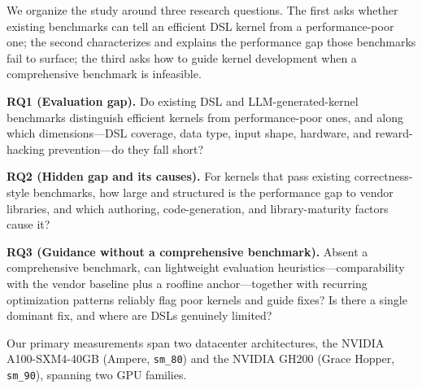 
We organize the study around three research questions.
The first asks whether existing benchmarks can tell an efficient DSL kernel from a
performance-poor one; the second characterizes and explains the performance gap those
benchmarks fail to surface; the third asks how to guide kernel development when a
comprehensive benchmark is infeasible.

\noindent\textbf{RQ1 (Evaluation gap).} Do existing DSL and LLM-generated-kernel
benchmarks distinguish efficient kernels from performance-poor ones, and along which
dimensions---DSL coverage, data type, input shape, hardware, and reward-hacking
prevention---do they fall short?

\medskip\noindent\textbf{RQ2 (Hidden gap and its causes).} For kernels that pass
existing correctness-style benchmarks, how large and structured is the performance gap
to vendor libraries, and which authoring, code-generation, and library-maturity factors
cause it?

\medskip\noindent\textbf{RQ3 (Guidance without a comprehensive benchmark).} Absent a
comprehensive benchmark, can lightweight evaluation heuristics---comparability with the
vendor baseline plus a roofline anchor---together with recurring optimization patterns
reliably flag poor kernels and guide fixes? Is there a single dominant fix, and where
are DSLs genuinely limited?

\medskip\noindent
Our primary measurements span two datacenter architectures, the NVIDIA A100-SXM4-40GB (Ampere, \texttt{sm\_80}) and the NVIDIA GH200 (Grace Hopper, \texttt{sm\_90}), spanning two GPU families.
